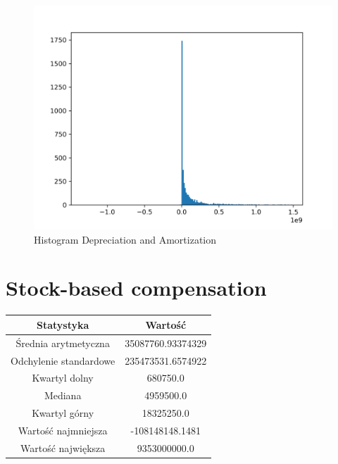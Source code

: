 \documentclass{article}
\begin{document}
\begin{figure}[h!]
    \includegraphics[width=\linewidth]{variables/Depreciation _ Amortization.png}
    \caption{Histogram Depreciation and Amortization }
\end{figure}\section{ Stock-based compensation }

\begin{center}
    \begin{tabular}{|c | c|} 
    \hline
    Statystyka & Wartość \\
    \hline\hline
    Średnia arytmetyczna & 35087760.93374329 \\ 
    \hline
    Odchylenie standardowe & 235473531.6574922 \\
    \hline
    Kwartyl dolny & 680750.0 \\
    \hline
    Mediana & 4959500.0 \\
    \hline
    Kwartyl górny & 18325250.0 \\
    \hline
    Wartość najmniejsza & -108148148.1481 \\
    \hline
    Wartość największa & 9353000000.0 \\
    \hline
   \end{tabular}
\end{center}
\end{document}
